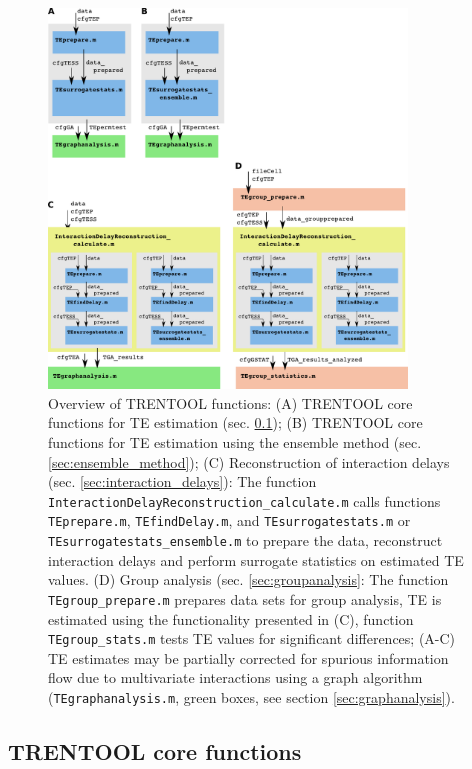 \documentclass[a4paper,10pt]{article}
\begin{document}
\begin{figure}[H]	
	\centering 	
 		\includegraphics[width=0.85\textwidth]{figures/TRENTOOL3_workflow_main.pdf}
	\caption[Overview TRENTOOL functions]{Overview of TRENTOOL functions: 
	(A) TRENTOOL core functions for TE estimation (sec. \ref{sec:core_functions}); 
	(B) TRENTOOL core functions for TE estimation using the ensemble method (sec. \ref{sec:ensemble_method}); 
	(C) Reconstruction of interaction delays (sec. \ref{sec:interaction_delays}): The function \texttt{InteractionDelayReconstruction\_calculate.m} calls functions \texttt{TEprepare.m}, \texttt{TEfindDelay.m}, and \texttt{TEsurrogatestats.m} or \texttt{TEsurrogatestats\_ensemble.m} to prepare the data, reconstruct interaction delays and perform surrogate statistics on estimated TE values.
	(D) Group analysis (sec. \ref{sec:groupanalysis}: The function \texttt{TEgroup\_prepare.m} prepares data sets for group analysis, TE is estimated using the functionality presented in (C), function \texttt{TEgroup\_stats.m} tests TE values for significant differences;
	(A-C) TE estimates may be partially corrected for spurious information flow due to multivariate interactions using a graph algorithm (\texttt{TEgraphanalysis.m}, green boxes, see section \ref{sec:graphanalysis}).}
	\label{fig:TRENTOOL3_workflow_overview}
\end{figure}


\subsection{TRENTOOL core functions}\label{sec:core_functions}
\end{document}
